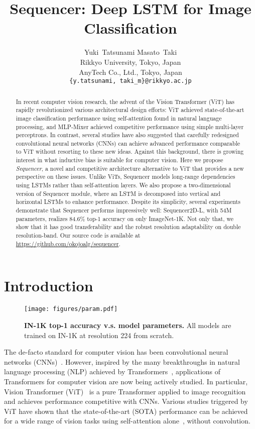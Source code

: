 \documentclass{article}
\title{Sequencer: Deep LSTM for Image Classification}
\author{
Yuki~Tatsunami\quad
Masato~Taki\quad \\
  Rikkyo University, Tokyo, Japan \\
  AnyTech Co., Ltd., Tokyo, Japan \\
\texttt{\{y.tatsunami, taki\_m\}@rikkyo.ac.jp}
}
\begin{document}
\maketitle

\begin{abstract}
In recent computer vision research, the advent of the Vision Transformer (ViT) has rapidly revolutionized various architectural design efforts: ViT achieved state-of-the-art image classification performance using self-attention found in natural language processing, and MLP-Mixer achieved competitive performance using simple multi-layer perceptrons. In contrast, several studies have also suggested that carefully redesigned convolutional neural networks (CNNs) can achieve advanced performance comparable to ViT without resorting to these new ideas. Against this background, there is growing interest in what inductive bias is suitable for computer vision. Here we propose \textit{Sequencer}, a novel and competitive architecture alternative to ViT that provides a new perspective on these issues. Unlike ViTs, Sequencer models long-range dependencies using LSTMs rather than self-attention layers. We also propose a two-dimensional version of Sequencer module, where an LSTM is decomposed into vertical and horizontal LSTMs to enhance performance. Despite its simplicity, several experiments demonstrate that Sequencer performs impressively well: Sequencer2D-L, with 54M parameters, realizes 84.6\% top-1 accuracy on only ImageNet-1K. Not only that, we show that it has good transferability and the robust resolution adaptability on double resolution-band. Our source code is available at \url{https://github.com/okojoalg/sequencer}.
\end{abstract}

\section{Introduction}
\begin{wrapfigure}{r}{0.45\textwidth}
  \centering
  \texttt{[image: figures/param.pdf]}
  \caption{\textbf{IN-1K top-1 accuracy v.s. model parameters.} All models are trained on IN-1K at resolution 224 from scratch.}
  \label{figure:main}
\end{wrapfigure}
The de-facto standard for computer vision has been convolutional neural networks (CNNs)~\cite{krizhevsky2012imagenet, simonyan2014very, he2016deep, szegedy2015going, szegedy2016rethinking, chollet2017xception, huang2017densely, tan2019efficientnet}. However, inspired by the many breakthroughs in natural language processing (NLP) achieved by Transformers~\cite{vaswani2017attention, devlin2018bert, radford2018improving}, applications of Transformers for computer vision are now being actively studied. In particular, Vision Transformer (ViT)~\cite{dosovitskiy2020image} is a pure Transformer applied to image recognition and achieves performance competitive with CNNs. Various studies triggered by ViT have shown that the state-of-the-art (SOTA) performance can be achieved for a wide range of vision tasks using self-attention alone~\cite{wang2021pyramid, liu2021swin, touvron2021going, liu2022swin, dong2022cswin}, without convolution.
\end{document}
